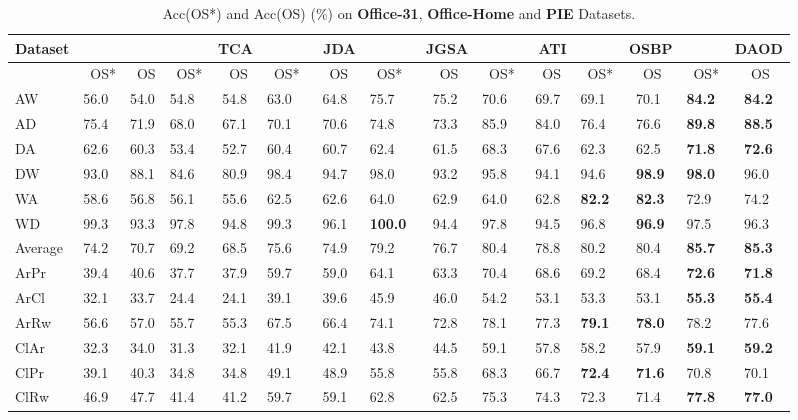 \documentclass[journal]{IEEEtran}
\begin{document}
\begin{table*}[t] \centering
\caption{Acc(OS*) and Acc(OS) (\%) on \textbf{Office-31}, \textbf{Office-Home} and \textbf{PIE} Datasets. } \begin{tabular}{p{0.75cm}p{0.5cm}p{0.5cm}p{0.5cm}p{0.5cm}p{0.5cm}p{0.5cm}p{0.5cm}p{0.5cm}p{0.5cm}p{0.5cm}p{0.5cm}p{0.5cm}p{0.5cm}p{0.5cm}} \hline

Dataset&\multicolumn{2}{p{0.5cm}}{~~~~~}&\multicolumn{2}{p{0.5cm}}{~~~~~~TCA}&\multicolumn{2}{p{0.5cm}}{~~~~~~~JDA}&\multicolumn{2}{p{0.5cm}}{~~~~~~~JGSA}&\multicolumn{2}{p{0.5cm}}{~~~~~~~ATI}&\multicolumn{2}{p{0.5cm}}{~~~~~~OSBP}&\multicolumn{2}{p{0.5cm}}{~~~~~~DAOD}\\ 
\hline
&~OS*&~OS&~OS*&~OS&~OS*&~OS&~OS*&~OS&~OS*&~OS&~OS*&~OS&~OS*&~OS\\
\hline
AW  &56.0&54.0&54.8&54.8&63.0&64.8&75.7&75.2&70.6&69.7&69.1&70.1&\textbf{84.2}&\textbf{84.2}\\
AD &75.4&71.9&68.0&67.1&70.1&70.6&74.8&73.3&85.9&84.0&76.4&76.6&\textbf{89.8}&\textbf{88.5}\\
DA &62.6&60.3&53.4&52.7&60.4&60.7&62.4&61.5&68.3&67.6&62.3&62.5&\textbf{71.8}&\textbf{72.6}\\
DW &93.0&88.1&84.6&80.9&98.4&94.7&98.0&93.2&95.8&94.1&94.6&\textbf{98.9}&\textbf{98.0}&96.0\\
WA &58.6&56.8&56.1&55.6&62.5&62.6&64.0&62.9&64.0&62.8&\textbf{82.2}&\textbf{82.3}&72.9&74.2\\
WD &{99.3}&93.3&97.8&94.8&99.3&96.1&\textbf{100.0}&94.4&97.8&94.5&96.8&\textbf{96.9}&97.5&96.3\\
\hline
Average &74.2&70.7&69.2&68.5&75.6&74.9&79.2&76.7&80.4&78.8&80.2&80.4&\textbf{85.7}&\textbf{85.3}\\
\hline
\hline
ArPr &39.4&40.6&37.7&37.9&59.7&59.0&64.1&63.3&{70.4}&68.6&{69.2}&68.4&\textbf{72.6}&\textbf{71.8}\\
ArCl &32.1&33.7&24.4&24.1&39.1&39.6&45.9&46.0&54.2&53.1&53.3&53.1&\textbf{55.3}&\textbf{55.4}\\
ArRw &56.6&57.0&55.7&55.3&67.5&66.4&74.1&72.8&78.1&77.3&\textbf{79.1}&\textbf{78.0}&{78.2}&{77.6}\\
ClAr &32.3&34.0&31.3&32.1&41.9&42.1&43.8&44.5&59.1&57.8&58.2&57.9&\textbf{59.1}&\textbf{59.2}\\
ClPr &39.1&40.3&34.8&34.8&49.1&48.9&55.8&55.8&68.3&66.7&\textbf{72.4}&\textbf{71.6}&70.8&70.1\\
ClRw &46.9&47.7&41.4&41.2&59.7&59.1&62.8&62.5&75.3&74.3&72.3&71.4&\textbf{77.8}&\textbf{77.0}\\

\end{tabular}
\end{table*}
\end{document}
